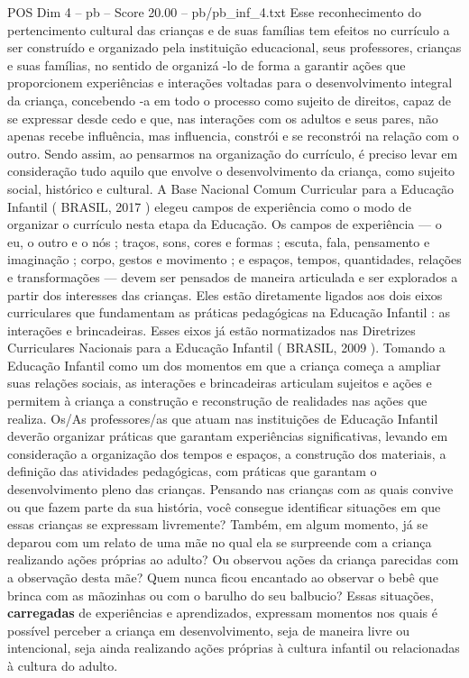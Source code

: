 \begin{textsample}{POS Dim 4 – pb – Score 20.00 – pb/pb\_inf\_4.txt}
Esse reconhecimento do pertencimento cultural das crianças e de suas famílias tem efeitos no currículo a ser construído e organizado pela instituição educacional, seus professores, crianças e suas famílias, no sentido de organizá -lo de forma a garantir ações que proporcionem experiências e interações voltadas para o desenvolvimento integral da criança, concebendo -a em todo o processo como sujeito de direitos, capaz de se expressar desde cedo e que, nas interações com os adultos e seus pares, não apenas recebe influência, mas influencia, constrói e se reconstrói na relação com o outro.
Sendo assim, ao pensarmos na organização do currículo, é preciso levar em consideração tudo aquilo que envolve o desenvolvimento da criança, como sujeito social, histórico e cultural.
A Base Nacional Comum Curricular para a Educação Infantil ( BRASIL, 2017 ) elegeu campos de experiência como o modo de organizar o currículo nesta etapa da Educação.
Os campos de experiência — o eu, o outro e o nós ; traços, sons, cores e formas ; escuta, fala, pensamento e imaginação ; corpo, gestos e movimento ; e espaços, tempos, quantidades, relações e transformações — devem ser pensados de maneira articulada e ser explorados a partir dos interesses das crianças.
Eles estão diretamente ligados aos dois eixos curriculares que fundamentam as práticas pedagógicas na Educação Infantil : as interações e brincadeiras.
Esses eixos já estão normatizados nas Diretrizes Curriculares Nacionais para a Educação Infantil ( BRASIL, 2009 ).
Tomando a Educação Infantil como um dos momentos em que a criança começa a ampliar suas relações sociais, as interações e brincadeiras articulam sujeitos e ações e permitem à criança a construção e reconstrução de realidades nas ações que realiza.
Os/As professores/as que atuam nas instituições de Educação Infantil deverão organizar práticas que garantam experiências significativas, levando em consideração a organização dos tempos e espaços, a construção dos materiais, a definição das atividades pedagógicas, com práticas que garantam o desenvolvimento pleno das crianças.
Pensando nas crianças com as quais convive ou que fazem parte da sua história, você consegue identificar situações em que essas crianças se expressam livremente?
Também, em algum momento, já se deparou com um relato de uma mãe no qual ela se surpreende com a criança realizando ações próprias ao adulto?
Ou observou ações da criança parecidas com a observação desta mãe?
Quem nunca ficou encantado ao observar o bebê que brinca com as mãozinhas ou com o barulho do seu balbucio?
Essas situações, \textbf{carregadas} de experiências e aprendizados, expressam momentos nos quais é possível perceber a criança em desenvolvimento, seja de maneira livre ou intencional, seja ainda realizando ações próprias à cultura infantil ou relacionadas à cultura do adulto.

\end{textsample}
